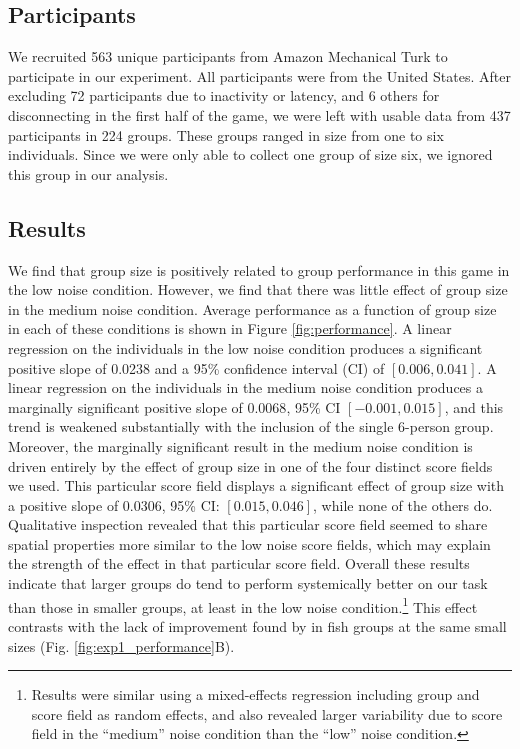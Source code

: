 \documentclass[12pt,letterpaper]{article}
\begin{document}
\subsection{Participants}
We recruited 563 unique participants from Amazon Mechanical Turk to
participate in our experiment.  All participants were from the United
States.  After excluding 72 participants due to inactivity or latency,
and 6 others for disconnecting in the first half of the game, we were
left with usable data from 437 participants in 224 groups.  These
groups ranged in size from one to six individuals.  Since we were only
able to collect one group of size six, we ignored this group in our
analysis.

\subsection{Results}

We find that group size is positively related to group performance in this game in the low noise condition.  However, we find that there was
little effect of group size in the medium noise condition.  Average performance as a function of group size in each of these conditions is shown in Figure \ref{fig:performance}.  A linear regression on the individuals in the low noise condition produces a significant positive slope of 0.0238 and a 95\% confidence interval (CI) of $[0.006,0.041]$.  A linear regression on the individuals in the medium noise condition produces a marginally significant positive slope of $0.0068$, 95\% CI $[-0.001,0.015]$, and this trend is weakened substantially with the inclusion of the single 6-person group. 
Moreover, the marginally significant result in the medium noise condition is driven entirely by the effect of group size in one of the four distinct score fields we used.  This particular score field displays a significant effect of group size with a positive slope of 0.0306, 95\% CI: $[0.015,0.046]$, while none of the others do. Qualitative inspection revealed that this particular score field seemed to share spatial properties more similar to the low noise score fields, which may explain the strength of the effect in that particular score field.  Overall these results indicate that larger groups do tend to perform systemically better on our task than those in smaller groups, at least in the low noise
condition.\footnote{Results were similar using a mixed-effects regression including group and score field as random effects, and also revealed larger variability due to score field in the ``medium'' noise condition than the ``low'' noise condition.}
This effect contrasts with the lack of improvement found by  in fish groups at the same small sizes (Fig. \ref{fig:exp1_performance}B).
\end{document}
